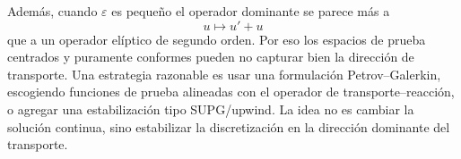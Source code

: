\documentclass[11pt]{article}
\begin{document}
\begin{enumerate}[label=\textbf{\arabic*.}, leftmargin=*]
\begin{enumerate}[label=(\alph*), leftmargin=*]
    Además, cuando $\varepsilon$ es pequeño el operador dominante se parece más a
    \[
        u\mapsto u'+u
    \]
    que a un operador elíptico de segundo orden. Por eso los espacios de prueba centrados y puramente conformes pueden no capturar bien la dirección de transporte. Una estrategia razonable es usar una formulación Petrov--Galerkin, escogiendo funciones de prueba alineadas con el operador de transporte--reacción, o agregar una estabilización tipo SUPG/upwind. La idea no es cambiar la solución continua, sino estabilizar la discretización en la dirección dominante del transporte.
\end{enumerate}

\end{enumerate}
\end{document}

